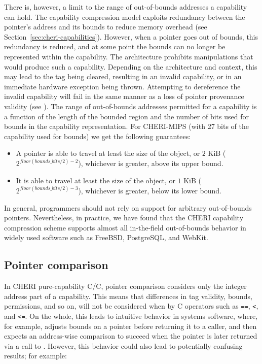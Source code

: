 \documentclass[12pt,twoside,openright,usletter]{article}
\newcommand{\ccode}[1]{{\small\ttfamily{#1}}}
\newcommand{\cfunc}[1]{{\ccode{#1()}}}
\newcommand{\note}[2]{{\color{blue}[ Note: #1 - #2]}}
\renewcommand{\note}[2]{\relax\ifhmode\unskip\fi}
\newcommand{\arnote}[1]{\note{#1}{Alex R.}}
\newcommand{\psnote}[1]{\note{#1}{Peter S.}}
\newcommand*{\cpp}[1][]{C\textsmaller[2]{\nolinebreak[4]\hspace{-.05em}\raisebox{.45ex}{\textbf{++}}}}
\newcommand*{\purecapCOrCpp}[1]{CHERI pure-capability C/\cpp{}}
\begin{document}
There is, however, a limit to the range of out-of-bounds addresses a capability can hold.
The capability compression model exploits redundancy between the pointer's address and
its bounds to reduce memory overhead (see
Section~\ref{sec:cheri-capabilities}).
However, when a pointer goes out of bounds, this redundancy is reduced, and at
some point the bounds can no longer be represented within the capability.
The architecture prohibits manipulations that would produce such
a capability.
Depending on the architecture and context, this may lead to the
tag being cleared, resulting in an invalid capability, or in an immediate
hardware exception being thrown.
Attempting to dereference the invalid capability will fail in the same
manner as a loss of pointer provenance validity (see
).
\psnote{Comment on whether that should immediately trap instead?}
The range of out-of-bounds addresses permitted for a capability is
a function of the length of the bounded region and the number of bits used for bounds in the capability representation.
For CHERI-MIPS (with 27 bits of the capability used for bounds) we get the following guarantees:
\arnote{Should probably say that only the lower bounds is affected by the mantissa bits.}

\begin{itemize}
\item A pointer is able to travel at least  the size of the object, or
  $2$ KiB ($2^{floor(bounds\_bits/2)-2}$), whichever is greater, above its upper bound.

\item It is able to travel at least  the size of the object, or $1$ KiB ($2^{floor(bounds\_bits/2)-3}$),
  whichever is greater, below its lower bound.
\end{itemize}

In general, programmers should not rely on support for arbitrary out-of-bounds
pointers.  Nevertheless, in practice, we have found that the CHERI capability
compression scheme supports almost all in-the-field out-of-bounds behavior in
widely used software such as FreeBSD, PostgreSQL, and WebKit.

\subsection{Pointer comparison}

In \purecapCOrCpp{}, pointer comparison considers only the
integer address part of a capability.
This means that differences in tag validity, bounds, permissions, and so on,
will not be considered when by C operators such as \texttt{==}, \texttt{<}, and \texttt{<=}.
On the whole, this leads to intuitive behavior in systems software, where,
for example, \cfunc{malloc} adjusts bounds on a pointer before returning it to
a caller, and then expects an address-wise comparison to succeed when the
pointer is later returned via a call to \cfunc{free}.
However, this behavior could also lead to potentially confusing results; for
example:
\end{document}
